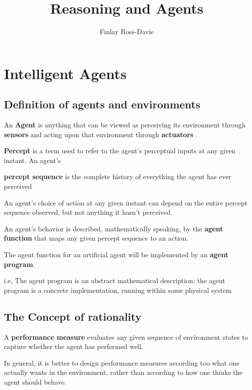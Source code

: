 \documentclass{article}
\title{Reasoning and Agents}
\author{Finlay Ross-Davie}
\begin{document}
\maketitle


\section{Intelligent Agents}

\subsection{Definition of agents and environments}

An \textbf{Agent} is anything that can be viewed as perceiving its environment through \textbf{sensors} and acting upon that environment through \textbf{actuators} \newline. 

\textbf{Percept} is a term used to refer to the agent's perceptual inputs at any given instant. An agent's 

\textbf{percept sequence} is the complete history of everything the agent has ever perceived \newline

An agent's choice of action at any given instant can depend on the entire percept sequence observed, but not anything it hasn't perceived.

An agent's behavior is described, mathematically speaking, by the \textbf{agent function} that maps any given percept sequence to an action.

The agent function for an artificial agent will be implemented by an \textbf{agent program}.

i.e, The agent program is an abstract mathematical description; the agent program is a concrete implementation, running within some physical system 

\subsection{The Concept of rationality}

A \textbf{performance measure} evaluates any given sequence of environment states to capture whether the agent has performed well.

In general, it is better to design performance measures according too what one actually wants in the environment, rather than according to how one thinks the agent should behave. \newline
\end{document}
